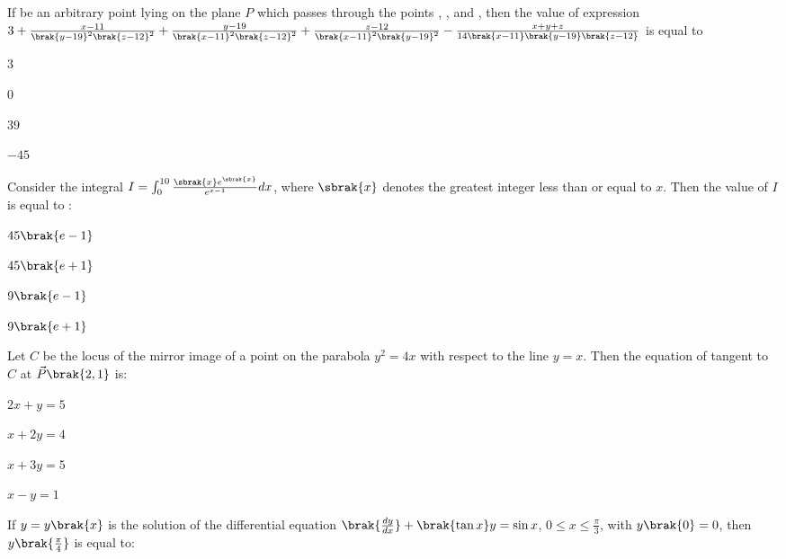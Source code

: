 \item If  be an arbitrary point lying on the plane $P$ which passes through the points , , and , then the value of expression $3+\frac{x-11}{\brak{y-19}^2\brak{z-12}^2}+\frac{y-19}{\brak{x-11}^2\brak{z-12}^2}+\frac{z-12}{\brak{x-11}^2\brak{y-19}^2} - \frac{x+y+z}{14\brak{x-11}\brak{y-19}\brak{z-12}}$ is equal to

\hfill{}
\begin{enumerate}
\begin{multicols}{4}
\item $3$
\item $0$
\item $39$
\item $-45$
\end{multicols}
\end{enumerate}

\item Consider the integral $I=\int_{0}^{10}\frac{\sbrak{x}e^{\sbrak{x}}}{e^{x-1}}dx$, where $\sbrak{x}$ denotes the greatest integer less than or equal to $x$. Then the value of $I$ is equal to :

\hfill{}
\begin{enumerate}
\begin{multicols}{4}
\item $45\brak{e-1}$
\item $45\brak{e+1}$
\item $9\brak{e-1}$
\item $9\brak{e+1}$
\end{multicols}
\end{enumerate}

\item Let $C$ be the locus of the mirror image of a point on the parabola $y^2=4x$ with respect to the line $y=x$. Then the equation of tangent to $C$ at $\vec{P}\brak{2,1}$ is:

\hfill{}
\begin{enumerate}
\begin{multicols}{4}
\item $2x+y=5$
\item $x+2y=4$
\item $x+3y=5$
\item $x-y=1$
\end{multicols}
\end{enumerate}

\item If $y=y\brak{x}$ is the solution of the differential equation $\brak{\frac{dy}{dx}}+\brak{\tan x}y=\sin x$, $0\leq x\leq \frac{\pi}{3}$, with $y\brak{0}=0$, then $y\brak{\frac{\pi}{4}}$ is equal to:

